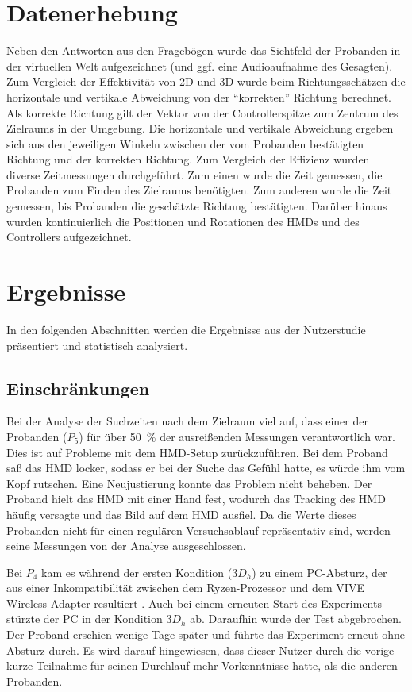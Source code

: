 \section{Datenerhebung}
Neben den Antworten aus den Fragebögen wurde das Sichtfeld der Probanden in der virtuellen Welt aufgezeichnet (und ggf. eine Audioaufnahme des Gesagten).
Zum Vergleich der Effektivität von 2D und 3D wurde beim Richtungsschätzen die horizontale und vertikale Abweichung von der \enquote{korrekten} Richtung berechnet.
Als korrekte Richtung gilt der Vektor von der Controllerspitze zum Zentrum des Zielraums in der Umgebung.
Die horizontale und vertikale Abweichung ergeben sich aus den jeweiligen Winkeln zwischen der vom Probanden bestätigten Richtung und der korrekten Richtung.
Zum Vergleich der Effizienz wurden diverse Zeitmessungen durchgeführt.
Zum einen wurde die Zeit gemessen, die Probanden zum Finden des Zielraums benötigten.
Zum anderen wurde die Zeit gemessen, bis Probanden die geschätzte Richtung bestätigten.
Darüber hinaus wurden kontinuierlich die Positionen und Rotationen des HMDs und des Controllers aufgezeichnet.

\section{Ergebnisse}
In den folgenden Abschnitten werden die Ergebnisse aus der Nutzerstudie präsentiert und statistisch analysiert.

\subsection*{Einschränkungen}
Bei der Analyse der Suchzeiten nach dem Zielraum viel auf, dass einer der Probanden ($P_5$) für über \SI{50}{\percent} der ausreißenden Messungen verantwortlich war.
Dies ist auf Probleme mit dem HMD-Setup zurückzuführen.
Bei dem Proband saß das HMD locker, sodass er bei der Suche das Gefühl hatte, es würde ihm vom Kopf rutschen.
Eine Neujustierung konnte das Problem nicht beheben.
Der Proband hielt das HMD mit einer Hand fest, wodurch das Tracking des HMD häufig versagte und das Bild auf dem HMD ausfiel.
Da die Werte dieses Probanden nicht für einen regulären Versuchsablauf repräsentativ sind, werden seine Messungen von der Analyse ausgeschlossen.

Bei $P_4$ kam es während der ersten Kondition ($3D_h$) zu einem PC-Absturz, der aus einer Inkompatibilität zwischen dem Ryzen-Prozessor und dem VIVE Wireless Adapter resultiert \parencite{HTCCorporation2018c}.
Auch bei einem erneuten Start des Experiments stürzte der PC in der Kondition $3D_h$ ab.
Daraufhin wurde der Test abgebrochen.
Der Proband erschien wenige Tage später und führte das Experiment erneut ohne Absturz durch.
Es wird darauf hingewiesen, dass dieser Nutzer durch die vorige kurze Teilnahme für seinen Durchlauf mehr Vorkenntnisse hatte, als die anderen Probanden.

